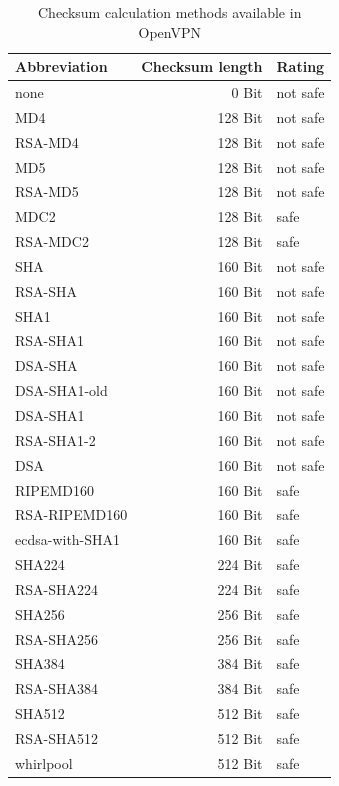 \begin{description}
  \begin{table}[!ht]
    \centering
    \caption{Checksum calculation methods available in OpenVPN}
    \label{openvpn:digests}
    \begin{tabular}{|p{4cm}|r|l|}
      \hline
      Abbreviation	& Checksum length & Rating\\
      \hline
      none             &   0 Bit & not safe \\
      MD4              & 128 Bit & not safe \\
      RSA-MD4          & 128 Bit & not safe \\
      MD5              & 128 Bit & not safe \\
      RSA-MD5          & 128 Bit & not safe \\
      MDC2             & 128 Bit & safe \\
      RSA-MDC2         & 128 Bit & safe \\
      SHA              & 160 Bit & not safe \\
      RSA-SHA          & 160 Bit & not safe \\
      SHA1             & 160 Bit & not safe \\
      RSA-SHA1         & 160 Bit & not safe \\
      DSA-SHA          & 160 Bit & not safe \\
      DSA-SHA1-old     & 160 Bit & not safe \\
      DSA-SHA1         & 160 Bit & not safe \\
      RSA-SHA1-2       & 160 Bit & not safe \\
      DSA              & 160 Bit & not safe \\
      RIPEMD160        & 160 Bit & safe \\
      RSA-RIPEMD160    & 160 Bit & safe \\
      ecdsa-with-SHA1  & 160 Bit & safe \\
      SHA224           & 224 Bit & safe \\
      RSA-SHA224       & 224 Bit & safe \\
      SHA256           & 256 Bit & safe \\
      RSA-SHA256       & 256 Bit & safe \\
      SHA384           & 384 Bit & safe \\
      RSA-SHA384       & 384 Bit & safe \\
      SHA512           & 512 Bit & safe \\
      RSA-SHA512       & 512 Bit & safe \\
      whirlpool        & 512 Bit & safe \\
      \hline
    \end{tabular}
  \end{table}


\end{description}
